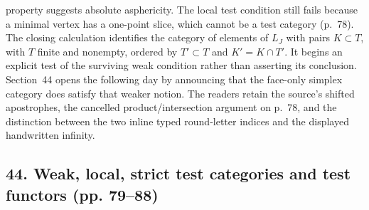 \documentclass[10pt,oneside]{book}
\begin{document}
property suggests absolute asphericity. The local test condition still fails because a minimal vertex has a one-point slice, which cannot be a test category (p.~78). The closing calculation identifies the category of elements of $L_J$ with pairs $K\subset T$, with $T$ finite and nonempty, ordered by $T'\subset T$ and $K'=K\cap T'$. It begins an explicit test of the surviving weak condition rather than asserting its conclusion. Section~44 opens the following day by announcing that the face-only simplex category does satisfy that weaker notion. The readers retain the source's shifted apostrophes, the cancelled product/intersection argument on p.~78, and the distinction between the two inline typed round-letter indices and the displayed handwritten infinity.

\subsection*{44. Weak, local, strict test categories and test functors (pp. 79--88)}
\end{document}
